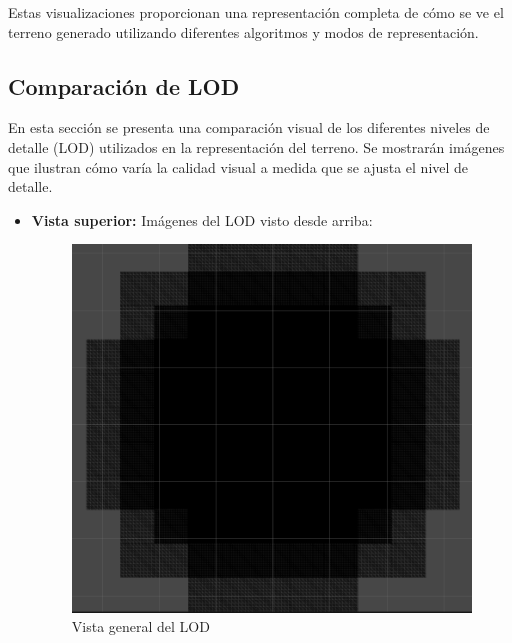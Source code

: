 Estas visualizaciones proporcionan una representación completa de cómo se ve el terreno generado utilizando diferentes algoritmos y modos de representación.

\subsection{Comparación de LOD}

En esta sección se presenta una comparación visual de los diferentes niveles de detalle (LOD) utilizados en la representación del terreno. Se mostrarán imágenes que ilustran cómo varía la calidad visual a medida que se ajusta el nivel de detalle.

\begin{itemize}
    \item \textbf{Vista superior: } Imágenes del LOD visto desde arriba:
    \begin{figure}[h]
        \begin{minipage}{0.45\textwidth}
            \centering
            \includegraphics[width=\textwidth]{img/codes/FlyViewLOD.png}
            \caption{Vista general del LOD}
        \end{minipage}%
        \hfill
        \begin{minipage}{0.45\textwidth}
            \centering

\end{minipage}
\end{figure}
\end{itemize}
